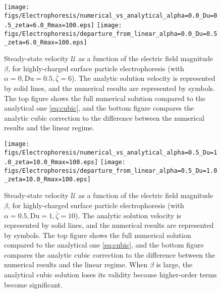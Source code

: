 \documentclass[MSc,beforeExam]{iitcsthesis}
\newcommand\cU{\mathscr{U}}
\begin{document}
\begin{figure}
    \begin{center}
    \texttt{[image: figs/Electrophoresis/numerical\_vs\_analytical\_alpha=0.0\_Du=0.5\_zeta=6.0\_Rmax=100.eps]}
    \texttt{[image: figs/Electrophoresis/departure\_from\_linear\_alpha=0.0\_Du=0.5\_zeta=6.0\_Rmax=100.eps]}
        \caption[Highly-charged surface particle steady-state velocity]{
        Steady-state velocity $\cU$ as a function of the 
        electric field magnitude $\beta$, for highly-charged surface particle
        electrophoresis (with $\alpha = 0, \text{Du} = 0.5, \bar\zeta = 6$).
        The analytic solution velocity is represented by solid lines, 
        and the numerical results are represented by symbols.
        The top figure shows the full numerical solution 
        compared to the analytical one \eqref{eq:cubic}, and
        the bottom figure compares the analytic cubic correction \cite{schnitzer2012cubic} 
        to the difference between the numerical results and the linear regime.}
	    \label{fig:Electrophoresis1}
    \end{center}
\end{figure}

\begin{figure}
    \begin{center}
    \texttt{[image: figs/Electrophoresis/numerical\_vs\_analytical\_alpha=0.5\_Du=1.0\_zeta=10.0\_Rmax=100.eps]}
    \texttt{[image: figs/Electrophoresis/departure\_from\_linear\_alpha=0.5\_Du=1.0\_zeta=10.0\_Rmax=100.eps]}
        \caption[Highly-charged surface particle steady-state velocity]{
        Steady-state velocity $\cU$ as a function of the 
        electric field magnitude $\beta$, for highly-charged surface particle
        electrophoresis (with $\alpha = 0.5, \text{Du} = 1, \bar\zeta = 10$).
        The analytic solution velocity is represented by solid lines, 
        and the numerical results are represented by symbols.
        The top figure shows the full numerical solution 
        compared to the analytical one \eqref{eq:cubic}, and
        the bottom figure compares the analytic cubic correction \cite{schnitzer2012cubic} 
        to the difference between the numerical results and the linear regime.
        When $\beta$ is large, the analytical cubic solution loses its validity 
        because higher-order terms become significant.}
	    \label{fig:Electrophoresis2}
    \end{center}
\end{figure}
\end{document}
